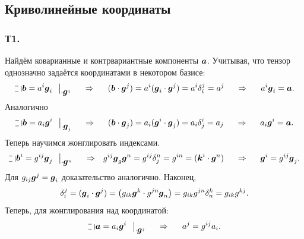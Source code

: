 \subsection{Криволинейные координаты}

\subsubsection*{Т1.}

Найдём коварианные и контрвариантные компоненты $\mbox{\boldmath $a$}$. Учитывая, что тензор однозначно задаётся координатами в некотором базисе:
$$
    \letus \vc{b} = a^i \vc{g}_i \hspace{0.25cm} \big|_{\cdot \vc{g}^j}
    \hspace{0.5cm} \Rightarrow \hspace{0.5cm}  
    (\vc{b} \cdot \vc{g}^j) = a^i (\vc{g}_i \cdot \vc{g}^j) = a^i \delta_i^j = a^j
    \hspace{0.5cm} \Rightarrow \hspace{0.5cm} a^i \vc{g}_i = \vc{a}.
$$
Аналогично
$$
    \letus \vc{b} = a_i \vc{g}^i \hspace{0.25cm} \big|_{\cdot \vc{g}_j}
    \hspace{0.5cm} \Rightarrow \hspace{0.5cm} 
    (\vc{b} \cdot \vc{g}_j) = a_i (\vc{g}^i \cdot \vc{g}_j) = a_i \delta_j^i = a_j
    \hspace{0.5cm} \Rightarrow \hspace{0.5cm} a_i \vc{g}^i = \vc{a}.
$$
Теперь научимся жонглировать индексами. 
$$
    \letus \vc{b}^i = g^{ij} \vc{g}_j \hspace{0.25cm} \big|_{\cdot \vc{g}^n} \hspace{0.5cm} \Rightarrow \hspace{0.25cm} 
    g^{ij} \vc{g}_g \vc{g}^n = g^{ij} \delta^n_j = g^{in} =  (\vc{k}^i \cdot \vc{g}^n)
    \hspace{0.5cm} 
    \Rightarrow
    \hspace{0.5cm} 
    \vc{g}^i = g^{ij} \vc{g}_j.
$$
Для $g_{ij} \mbox{\boldmath $g$}^{j} = \mbox{\boldmath $g$}_i$ доказательство аналогично. Наконец,
$$
    \delta_i^j = (\mbox{\boldmath $g$}_i \cdot \mbox{\boldmath $g$}^j) = \left(
        g_{ik} \mbox{\boldmath $g$}^k \cdot g^{jn} \mbox{\boldmath $g$}_n
    \right) = g_{ik} g^{jn} \delta_n^k = g_{ik} g^{kj}.
$$
Теперь, для жонглирования над координатой:
$$
    \letus \vc{a} = a_i \vc{g}^i \hspace{0.25cm} \big|_{\cdot \vc{g}^j}
    \hspace{0.5cm} \Rightarrow \hspace{0.5cm}   
    a^j = g^{ij} a_i.
$$

